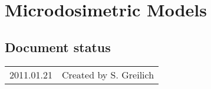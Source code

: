 \chapter{Microdosimetric Models}

\section*{Document status}
\begin{tabular}{l l}
2011.01.21&Created by S. Greilich
\end{tabular} 